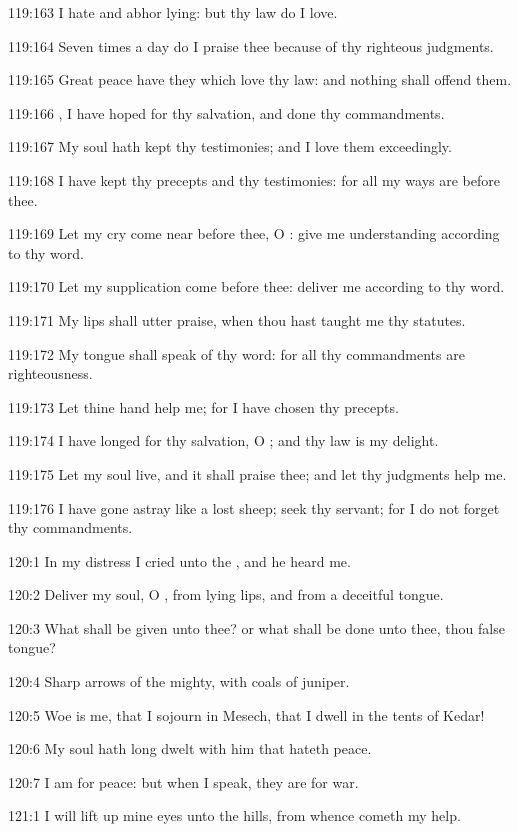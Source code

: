 119:163 I hate and abhor lying: but thy law do I love.

119:164 Seven times a day do I praise thee because of thy righteous judgments.

119:165 Great peace have they which love thy law: and nothing shall offend them.

119:166 \LORD, I have hoped for thy salvation, and done thy commandments.

119:167 My soul hath kept thy testimonies; and I love them exceedingly.

119:168 I have kept thy precepts and thy testimonies: for all my ways are before thee.

119:169 Let my cry come near before thee, O \LORD: give me understanding according to thy word.

119:170 Let my supplication come before thee: deliver me according to thy word.

119:171 My lips shall utter praise, when thou hast taught me thy statutes.

119:172 My tongue shall speak of thy word: for all thy commandments are righteousness.

119:173 Let thine hand help me; for I have chosen thy precepts.

119:174 I have longed for thy salvation, O \LORD; and thy law is my delight.

119:175 Let my soul live, and it shall praise thee; and let thy judgments help me.

119:176 I have gone astray like a lost sheep; seek thy servant; for I do not forget thy commandments.



120:1 In my distress I cried unto the \LORD, and he heard me.

120:2 Deliver my soul, O \LORD, from lying lips, and from a deceitful tongue.

120:3 What shall be given unto thee? or what shall be done unto thee, thou false tongue?

120:4 Sharp arrows of the mighty, with coals of juniper.

120:5 Woe is me, that I sojourn in Mesech, that I dwell in the tents of Kedar!

120:6 My soul hath long dwelt with him that hateth peace.

120:7 I am for peace: but when I speak, they are for war.



121:1 I will lift up mine eyes unto the hills, from whence cometh my help.

